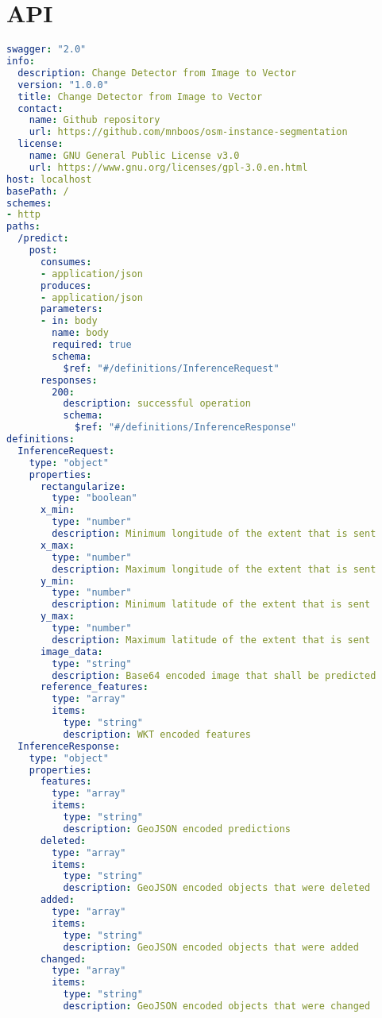 \appendix
\appendixpage
\noappendicestocpagenum
\addappheadtotoc

{
    \hypersetup{hidelinks}
    \markleft{\listfigurename}
    \listoffigures
}

{
    \hypersetup{hidelinks}
    \markleft{\listtablename}
    \listoftables
}

\chapter*{API}\label{chp:appendix:api}
\begin{lstlisting}[language=yaml]
swagger: "2.0"
info:
  description: Change Detector from Image to Vector
  version: "1.0.0"
  title: Change Detector from Image to Vector
  contact:
    name: Github repository
    url: https://github.com/mnboos/osm-instance-segmentation
  license:
    name: GNU General Public License v3.0
    url: https://www.gnu.org/licenses/gpl-3.0.en.html
host: localhost
basePath: /
schemes:
- http
paths:
  /predict:
    post:
      consumes:
      - application/json
      produces:
      - application/json
      parameters:
      - in: body
        name: body
        required: true
        schema:
          $ref: "#/definitions/InferenceRequest"
      responses:
        200:
          description: successful operation
          schema:
            $ref: "#/definitions/InferenceResponse"
definitions:
  InferenceRequest:
    type: "object"
    properties:
      rectangularize:
        type: "boolean"
      x_min:
        type: "number"
        description: Minimum longitude of the extent that is sent
      x_max:
        type: "number"
        description: Maximum longitude of the extent that is sent
      y_min:
        type: "number"
        description: Minimum latitude of the extent that is sent
      y_max:
        type: "number"
        description: Maximum latitude of the extent that is sent
      image_data:
        type: "string"
        description: Base64 encoded image that shall be predicted
      reference_features:
        type: "array"
        items:
          type: "string"
          description: WKT encoded features
  InferenceResponse:
    type: "object"
    properties:
      features:
        type: "array"
        items:
          type: "string"
          description: GeoJSON encoded predictions
      deleted:
        type: "array"
        items:
          type: "string"
          description: GeoJSON encoded objects that were deleted
      added:
        type: "array"
        items:
          type: "string"
          description: GeoJSON encoded objects that were added
      changed:
        type: "array"
        items:
          type: "string"
          description: GeoJSON encoded objects that were changed
\end{lstlisting}


\printbibliography


\markleft{\glossaryname}
\printglossaries
\markleft{\indexname}
\printindex